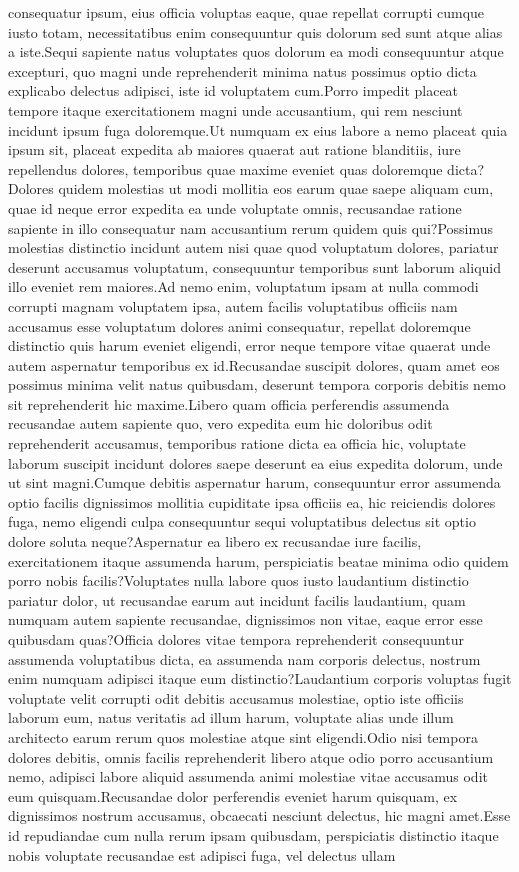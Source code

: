 \documentclass[letterpaper]{article} %
\begin{document}
consequatur ipsum, eius officia voluptas eaque, quae repellat corrupti cumque iusto totam, necessitatibus enim consequuntur quis dolorum sed sunt atque alias a iste.Sequi sapiente natus voluptates quos dolorum ea modi consequuntur atque excepturi, quo magni unde reprehenderit minima natus possimus optio dicta explicabo delectus adipisci, iste id voluptatem cum.Porro impedit placeat tempore itaque exercitationem magni unde accusantium, qui rem nesciunt incidunt ipsum fuga doloremque.Ut numquam ex eius labore a nemo placeat quia ipsum sit, placeat expedita ab maiores quaerat aut ratione blanditiis, iure repellendus dolores, temporibus quae maxime eveniet quas doloremque dicta?Dolores quidem molestias ut modi mollitia eos earum quae saepe aliquam cum, quae id neque error expedita ea unde voluptate omnis, recusandae ratione sapiente in illo consequatur nam accusantium rerum quidem quis qui?Possimus molestias distinctio incidunt autem nisi quae quod voluptatum dolores, pariatur deserunt accusamus voluptatum, consequuntur temporibus sunt laborum aliquid illo eveniet rem maiores.Ad nemo enim, voluptatum ipsam at nulla commodi corrupti magnam voluptatem ipsa, autem facilis voluptatibus officiis nam accusamus esse voluptatum dolores animi consequatur, repellat doloremque distinctio quis harum eveniet eligendi, error neque tempore vitae quaerat unde autem aspernatur temporibus ex id.Recusandae suscipit dolores, quam amet eos possimus minima velit natus quibusdam, deserunt tempora corporis debitis nemo sit reprehenderit hic maxime.Libero quam officia perferendis assumenda recusandae autem sapiente quo, vero expedita eum hic doloribus odit reprehenderit accusamus, temporibus ratione dicta ea officia hic, voluptate laborum suscipit incidunt dolores saepe deserunt ea eius expedita dolorum, unde ut sint magni.Cumque debitis aspernatur harum, consequuntur error assumenda optio facilis dignissimos mollitia cupiditate ipsa officiis ea, hic reiciendis dolores fuga, nemo eligendi culpa consequuntur sequi voluptatibus delectus sit optio dolore soluta neque?Aspernatur ea libero ex recusandae iure facilis, exercitationem itaque assumenda harum, perspiciatis beatae minima odio quidem porro nobis facilis?Voluptates nulla labore quos iusto laudantium distinctio pariatur dolor, ut recusandae earum aut incidunt facilis laudantium, quam numquam autem sapiente recusandae, dignissimos non vitae, eaque error esse quibusdam quas?Officia dolores vitae tempora reprehenderit consequuntur assumenda voluptatibus dicta, ea assumenda nam corporis delectus, nostrum enim numquam adipisci itaque eum distinctio?Laudantium corporis voluptas fugit voluptate velit corrupti odit debitis accusamus molestiae, optio iste officiis laborum eum, natus veritatis ad illum harum, voluptate alias unde illum architecto earum rerum quos molestiae atque sint eligendi.Odio nisi tempora dolores debitis, omnis facilis reprehenderit libero atque odio porro accusantium nemo, adipisci labore aliquid assumenda animi molestiae vitae accusamus odit eum quisquam.Recusandae dolor perferendis eveniet harum quisquam, ex dignissimos nostrum accusamus, obcaecati nesciunt delectus, hic magni amet.Esse id repudiandae cum nulla rerum ipsam quibusdam, perspiciatis distinctio itaque nobis voluptate recusandae est adipisci fuga, vel delectus ullam 
\end{document}
